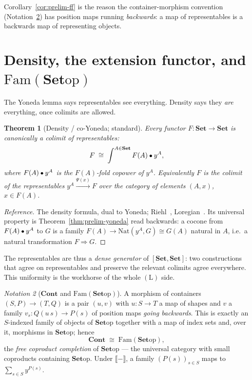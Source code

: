 \documentclass[11pt]{report}
\theoremstyle{plain}
\newtheorem{theorem}{Theorem}[chapter]
\theoremstyle{definition}
\theoremstyle{remark}
\newcommand{\Cont}{\mathbf{Cont}}
\newcommand{\Fam}{\mathrm{Fam}}
\newcommand{\Nat}{\mathrm{Nat}}
\newcommand{\op}{\mathrm{op}}
\newcommand{\Set}{\mathbf{Set}}
\newtheorem{notation}[theorem]{Notation}
\newcommand{\den}[1]{\llbracket #1 \rrbracket}
\newcommand{\yA}{y^{A}}
\newcommand{\co}{\mathbin{\text{\small$\bullet$}}}
\newcommand{\iso}{\cong}
\begin{document}
Corollary~\ref{cor:prelim-ff} is the reason the container-morphism convention
(Notation~\ref{not:prelim-cont}) has position maps running \emph{backwards}: a map
of representables is a backwards map of representing objects.

\section{Density, the extension functor, and \texorpdfstring{$\Fam(\Set\op)$}{Fam(Set-op)}}
\label{sec:prelim-density}

The Yoneda lemma says representables see everything. Density says they \emph{are}
everything, once colimits are allowed.

\begin{theorem}[Density / co-Yoneda; standard]
\label{thm:prelim-density}
Every functor $F\colon\Set\to\Set$ is canonically a colimit of representables:
\[
  F \;\iso\; \int^{A\in\Set} F(A)\co \yA,
\]
where $F(A)\co\yA$ is the $F(A)$-fold copower of $\yA$. Equivalently $F$ is the
colimit of the representables $\yA\xrightarrow{\Psi(x)}F$ over the category of
elements $(A,x)$, $x\in F(A)$.
\end{theorem}

\begin{proof}[Reference]
The density formula, dual to Yoneda; Riehl~\cite[\S6.2]{riehl},
Loregian~\cite[Ch.~2]{loregian}. Its universal property is
Theorem~\ref{thm:prelim-yoneda} read backwards: a cocone from $F(A)\co\yA$ to $G$
is a family $F(A)\to\Nat(\yA,G)\iso G(A)$ natural in $A$, i.e.\ a natural
transformation $F\Rightarrow G$.
\end{proof}

The representables are thus a \emph{dense generator} of $[\Set,\Set]$: two
constructions that agree on representables and preserve the relevant colimits
agree everywhere. This uniformity is the workhorse of the whole $(\mathrm{L})$
side.

\begin{notation}[$\Cont$ and $\Fam(\Set\op)$]
\label{not:prelim-cont}
A morphism of containers $(S,P)\to(T,Q)$ is a pair $(u,v)$ with $u\colon S\to T$ a
map of shapes and $v$ a family $v_s\colon Q(u\,s)\to P(s)$ of position maps
\emph{going backwards}. This is exactly an $S$-indexed family of objects of
$\Set\op$ together with a map of index sets and, over it, morphisms in $\Set\op$;
hence
\[
  \Cont\;\iso\;\Fam(\Set\op),
\]
the \emph{free coproduct completion} of $\Set\op$ --- the universal category with
small coproducts containing $\Set\op$. Under $\den{-}$, a family
$(P(s))_{s\in S}$ maps to $\sum_{s\in S}y^{P(s)}$.
\end{notation}
\end{document}
